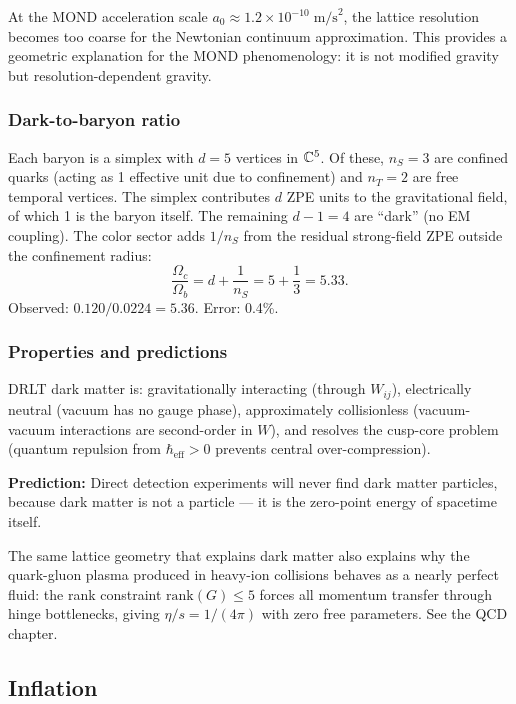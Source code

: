 At the MOND acceleration scale $a_0 \approx 1.2 \times 10^{-10}\;\text{m/s}^2$, the lattice resolution becomes too coarse for the Newtonian continuum approximation. This provides a geometric explanation for the MOND phenomenology: it is not modified gravity but resolution-dependent gravity.

\subsubsection{Dark-to-baryon ratio}

Each baryon is a simplex with $d = 5$ vertices in $\mathbb{C}^5$. Of these, $n_S = 3$ are confined quarks (acting as 1 effective unit due to confinement) and $n_T = 2$ are free temporal vertices. The simplex contributes $d$ ZPE units to the gravitational field, of which 1 is the baryon itself. The remaining $d - 1 = 4$ are ``dark'' (no EM coupling). The color sector adds $1/n_S$ from the residual strong-field ZPE outside the confinement radius:
\begin{equation}
\frac{\Omega_c}{\Omega_b} = d + \frac{1}{n_S} = 5 + \frac{1}{3} = 5.33.
\end{equation}
Observed: $0.120/0.0224 = 5.36$. Error: 0.4\%.

\subsubsection{Properties and predictions}

DRLT dark matter is: gravitationally interacting (through $W_{ij}$), electrically neutral (vacuum has no gauge phase), approximately collisionless (vacuum-vacuum interactions are second-order in $W$), and resolves the cusp-core problem (quantum repulsion from $\hbar_\text{eff} > 0$ prevents central over-compression).

\textbf{Prediction:} Direct detection experiments will never find dark matter particles, because dark matter is not a particle --- it is the zero-point energy of spacetime itself.

\begin{remark}
The same lattice geometry that explains dark matter also explains why the quark-gluon plasma produced in heavy-ion collisions behaves as a nearly perfect fluid: the rank constraint $\text{rank}(G) \leq 5$ forces all momentum transfer through hinge bottlenecks, giving $\eta/s = 1/(4\pi)$ with zero free parameters. See the QCD chapter.
\end{remark}

\subsection{Inflation}

